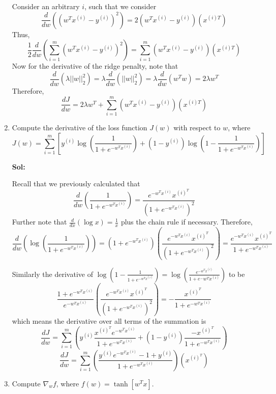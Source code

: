 \documentclass[11pt]{article}
\begin{document}
\begin{enumerate}
  Consider an arbitrary $i$, such that we consider
  \[\frac{d}{dw}((w^T x^{(i)} - y^{(i)})^2) = 2(w^Tx^{(i)} - y^{(i)})(x^{(i)T})\]
  Thus, 
  \[\frac{1}{2}\frac{d}{dw}(\sum_{i=1}^m (w^T x^{(i)} - y^{(i)})^2) = \sum_{i=1}^m (w^T x^{(i)} - y^{(i)})(x^{(i)T})\]
  Now for the derivative of the ridge penalty, note that 
  \[\frac{d}{dw}(\lambda ||w||_2^2) = \lambda \frac{d}{dw}(||w||_2^2) = \lambda \frac{d}{dw}(w^T w) = 2\lambda w^T\]
  Therefore,
  \[\frac{dJ}{dw} = 2\lambda w^T + \sum_{i=1}^m (w^T x^{(i)} - y^{(i)})(x^{(i)T})\]

  \newpage

  \item Compute the derivative of the loss function $J(w)$ with respect to $w$, where 
\[J(w) = \sum_{i=1}^{m} \left[y^{(i)} \log \left(\frac{1}{1 + e^{-w^{T}x^{(i)}}}\right) + \left(1 - y^{(i)}\right) \log \left(1- \frac{1}{1 + e^{-w^{T}x^{(i)}}}\right)\right]\]

\textbf{Sol:}

  Recall that we previously calculated that
  \[\frac{d}{dw}(\frac{1}{1 + e^{-w^T x^{(i)}}}) = \frac{e^{-w^T x^{(i)}}x^{(i)^T}}{(1 + e^{-w^T x^{(i)}})^2}\]
  Further note that $\frac{d}{dx}(\log x) = \frac{1}{x}$ plus the chain rule if necessary. Therefore, 
  \[\frac{d}{dw}(\log (\frac{1}{1 + e^{-w^T x^{(i)}}})) = (1 + e^{-w^T x^{(i)}})(\frac{ e^{-w^T x^{(i)}}x^{(i)^T}}{(1 + e^{-w^T x^{(i)}})^2}) = \frac{ e^{-w^T x^{(i)}}x^{(i)^T}}{1 + e^{-w^T x^{(i)}}}\]
  
  Similarly the derivative of $\log(1 - \frac{1}{1 + e^{-w^T x^{(i)}}}) = \log(\frac{e^{-w^T x^{(i)}}}{1 + e^-w^T x^{(i)}})$ to be
  \[\frac{1 + e^{-w^T x^{(i)}}}{e^{-w^T x^{(i)}}} (\frac{ e^{-w^T x^{(i)}}x^{(i)^T}}{(1 + e^{-w^T x^{(i)}})^2}) = -\frac{x^{(i)^T}}{1 + e^{-w^T x^{(i)}}}\]
  which means the derivative over all terms of the summation is 
  \[\frac{dJ}{dw} = \sum_{i=1}^m \left( y^{(i)}\frac{x^{(i)^T} e^{-w^T x^{(i)}}}{1 + e^{-w^T x^{(i)}}} + (1- y^{(i)})\frac{-x^{(i)^T}}{1 + e^{-w^T x^{(i)}}} \right)\]
  \[\frac{dJ}{dw} = \sum_{i=1}^m \left( \frac{y^{(i)}e^{-w^T x^{(i)}} - 1 + y^{(i)}}{1 + e^{-w^Tx^{(i)}}}\right)\left(x^{(i)^T}\right)\]

\newpage

\item Compute $\nabla_w f$, where $f(w) = \tanh \left[w^T x\right]$.


\end{enumerate}
\end{document}
